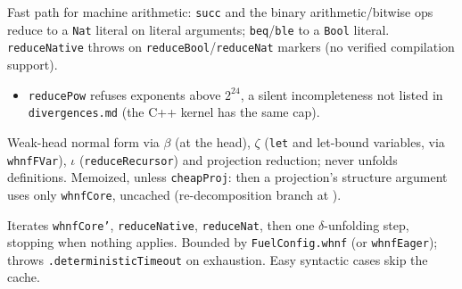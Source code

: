 \begin{definition}
\label{def:kernel-reduce-nat}
\leanok
{} Fast path for machine arithmetic: \texttt{succ} and the binary arithmetic/bitwise
ops reduce to a \texttt{Nat} literal on literal arguments; \texttt{beq}/\texttt{ble} to a
\texttt{Bool} literal. \texttt{reduceNative} throws on \texttt{reduceBool}/\texttt{reduceNat}
markers (no verified compilation support).
\begin{itemize}
\item {} \texttt{reducePow} refuses exponents above $2^{24}$, a silent incompleteness
not listed in \texttt{divergences.md} (the C++ kernel has the same cap).
\end{itemize}
\end{definition}

\begin{definition}
\label{def:kernel-whnf-core}
\leanok
{}

 Weak-head normal form via $\beta$ (at the head), $\zeta$ (\texttt{let} and
let-bound variables, via \texttt{whnfFVar}), $\iota$ (\texttt{reduceRecursor}) and projection
reduction; never unfolds definitions. Memoized, unless \texttt{cheapProj}: then a projection's
structure argument uses only \texttt{whnfCore}, uncached (re-decomposition branch at
).
\end{definition}

\begin{definition}
\label{def:kernel-whnf}
\leanok
{}

 Iterates \texttt{whnfCore'}, \texttt{reduceNative}, \texttt{reduceNat}, then one
$\delta$-unfolding step, stopping when nothing applies. Bounded by \texttt{FuelConfig.whnf} (or
\texttt{whnfEager}); throws \texttt{.deterministicTimeout} on exhaustion. Easy syntactic cases
skip the cache.
\end{definition}

